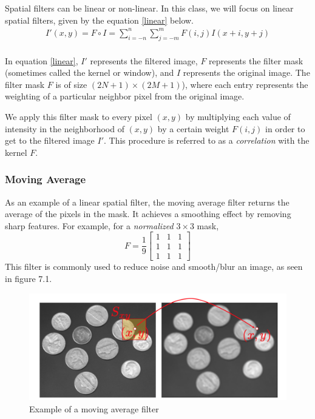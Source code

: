 \documentclass[twoside]{article}
\begin{document}
Spatial filters can be linear or non-linear. In this class, we will focus on linear spatial filters, given by the equation \ref{linear} below.
\begin{equation}
  \label{linear}
  \begin{aligned}
  	I'(x,y) = F \circ I = \sum_{i=-n}^n \sum_{j=-m}^m F(i,j)I(x+i,y+j)\\
  \end{aligned}
\end{equation}

In equation \ref{linear}, $I'$ represents the filtered image, $F$ represents the filter mask (sometimes called the kernel or window), and $I$ represents the original image. The filter mask $F$ is of size $(2N + 1)\times(2M + 1)$), where each entry represents the weighting of a particular neighbor pixel from the original image.

We apply this filter mask to every pixel $(x,y)$ by multiplying each value of intensity in the neighborhood of $(x,y)$ by a certain weight $F(i,j)$ in order to get to the filtered image $I'$. This procedure is referred to as a \textit{correlation} with the kernel $F$.

\subsubsection{Moving Average}
As an example of a linear spatial filter, the moving average filter returns the average of the pixels in the mask. It achieves a smoothing effect by removing sharp features. For example, for a \textit{normalized} $3\times3$ mask, 
\[
F = \frac{1}{9}
\begin{bmatrix}
1 & 1 & 1\\
1 & 1 & 1\\
1 & 1 & 1
\end{bmatrix}
\]
This filter is commonly used to reduce noise and smooth/blur an image, as seen in figure 7.1. 

\begin{figure}[h]
	\centering
	\includegraphics[scale=.4]{blur.png}
    \caption{Example of a moving average filter}
    \label{noisy}
\end{figure}
\end{document}
